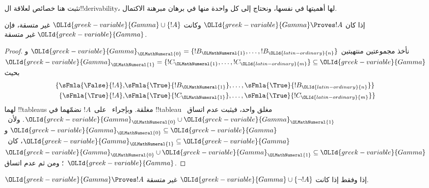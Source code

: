 \documentclass[../../../include/open-logic-section]{subfiles}
\begin{document}
      {}
      {}


نثبت هنا خصائص لعلاقة ال!!{derivability}، لها أهميتها في نفسها،
ونحتاج إلى كل واحدة منها في برهان مبرهنة الاكتمال.


\begin{prop}
  إذا كان $\OLId{greek-variable}{Gamma} \Proves !A$ وكانت $\OLId{greek-variable}{Gamma} \cup \{!A\}$ غير متسقة،
  فإن $\OLId{greek-variable}{Gamma}$ غير متسقة.
\end{prop}

\begin{proof}
نأخذ مجموعتين منتهيتين $\OLId{greek-variable}{Gamma}_\OLMathNumeral{0} = \{!B_\OLMathNumeral{1}, \dots, !B_\OLId{latin-ordinary}{n}\}$ و$\OLId{greek-variable}{Gamma}_\OLMathNumeral{1}
  =\{!C_\OLMathNumeral{1}, \dots, !C_\OLId{latin-ordinary}{m}\} \subseteq \OLId{greek-variable}{Gamma}$ بحيث
  \begin{align*}
    \{\sFmla{\False}{!A}, &
    \sFmla{\True}{!B_\OLMathNumeral{1}}, \dots, \sFmla{\True}{!B_\OLId{latin-ordinary}{n}}\} \\
    \{\sFmla{\True}{!A}, &
    \sFmla{\True}{!C_\OLMathNumeral{1}}, \dots, \sFmla{\True}{!C_\OLId{latin-ordinary}{m}}\}
  \end{align*}
  لهما !!{tableau}s مغلقة. وبإجراء~\Cut{} على~$!A$ نضمّهما
  في !!{tableau} مغلق واحد، فيثبت عدم اتساق~$\OLId{greek-variable}{Gamma}_\OLMathNumeral{0}
  \cup \OLId{greek-variable}{Gamma}_\OLMathNumeral{1}$. ولأن~$\OLId{greek-variable}{Gamma}_\OLMathNumeral{0}
  \subseteq \OLId{greek-variable}{Gamma}$ و$\OLId{greek-variable}{Gamma}_\OLMathNumeral{1} \subseteq \OLId{greek-variable}{Gamma}$، كان~$\OLId{greek-variable}{Gamma}_\OLMathNumeral{0} \cup
  \OLId{greek-variable}{Gamma}_\OLMathNumeral{1} \subseteq \OLId{greek-variable}{Gamma}$؛ ومن ثم عدم اتساق~$\OLId{greek-variable}{Gamma}$.
\end{proof}

\begin{prop}
$\OLId{greek-variable}{Gamma} \Proves !A$ إذا وفقط إذا كانت $\OLId{greek-variable}{Gamma} \cup \{\lnot !A\}$ غير متسقة.
\end{prop}
\end{document}
